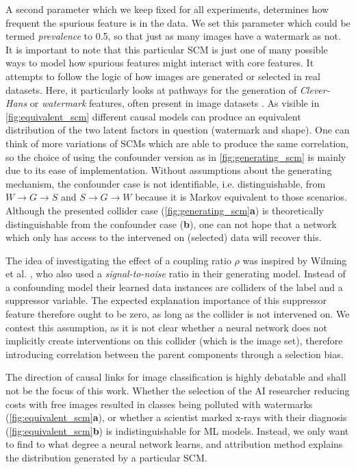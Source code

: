 A second parameter which we keep fixed for all experiments, determines how frequent the spurious feature is in the data. We set this parameter which could be termed \textit{prevalence} to 0.5, so that just as many images have a watermark as not. It is important to note that this particular SCM is just one of many possible ways to model how spurious features might interact with core features. It attempts to follow the logic of how images are generated or selected in real datasets. Here, it particularly looks at pathways for the generation of \textit{Clever-Hans} or \textit{watermark} features, often present in image datasets \cite{Lapuschkin2019}. As visible in \cref{fig:equivalent_scm} different causal models can produce an equivalent distribution of the two latent factors in question (watermark and shape). One can think of more variations of SCMs which are able to produce the same correlation, so the choice of using the confounder version as in \cref{fig:generating_scm} is mainly due to its ease of implementation. Without assumptions about the generating mechanism, the confounder case is not identifiable, i.e. distinguishable, from $W \rightarrow G \rightarrow S$ and $S \rightarrow G \rightarrow W$ because it is Markov equivalent to those scenarios. 
Although the presented collider case (\cref{fig:generating_scm}\textbf{a}) is theoretically distinguishable from the confounder case (\textbf{b}), one can not hope that a network which only has access to the intervened on (selected) data will recover this. 

The idea of investigating the effect of a coupling ratio $\rho$ was inspired by Wilming et al. \cite{Wilming2023}, who also used a \textit{signal-to-noise} ratio in their generating model. Instead of a confounding model their learned data instances are colliders of the label and a suppressor variable. The expected explanation importance of this suppressor feature therefore ought to be zero, as long as the collider is not intervened on. We contest this assumption, as it is not clear whether a neural network does not implicitly create interventions on this collider (which is the image set), therefore introducing correlation between the parent components through a selection bias. 

The direction of causal links for image classification is highly debatable and shall not be the focus of this work. Whether the selection of the AI researcher reducing costs with free images resulted in classes being polluted with watermarks (\cref{fig:equivalent_scm}\textbf{a}), or whether a scientist marked x-rays with their diagnosis (\cref{fig:equivalent_scm}\textbf{b}) is indistinguishable for ML models. 
Instead, we only want to find to what degree a neural network learns, and attribution method explains the distribution generated by a particular SCM.

